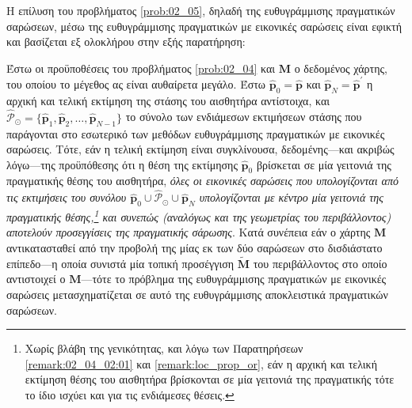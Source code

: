 Η επίλυση του προβλήματος \ref{prob:02_05}, δηλαδή της ευθυγράμμισης
πραγματικών σαρώσεων, μέσω της ευθυγράμμισης πραγματικών με εικονικές σαρώσεις
είναι εφικτή και βασίζεται εξ ολοκλήρου στην εξής παρατήρηση:

\begin{gg_box}
\begin{remark}
Έστω οι προϋποθέσεις του προβλήματος \ref{prob:02_04} και $\bm{M}$ ο δεδομένος
χάρτης, του οποίου το μέγεθος ας είναι αυθαίρετα μεγάλο. Έστω $\hat{\bm{p}}_0 =
\hat{\bm{p}}$ και $\hat{\bm{p}}_N = \hat{\bm{p}}^\prime$ η αρχική και τελική
εκτίμηση της στάσης του αισθητήρα αντίστοιχα, και $\hat{\mathcal{P}}_\odot =
\{\hat{\bm{p}}_1, \hat{\bm{p}}_2,\dots, \hat{\bm{p}}_{N-1}\}$ το σύνολο των
ενδιάμεσων εκτιμήσεων στάσης που παράγονται στο εσωτερικό των μεθόδων
ευθυγράμμισης πραγματικών με εικονικές σαρώσεις. Τότε, εάν η τελική εκτίμηση
είναι συγκλίνουσα, δεδομένης---και ακριβώς λόγω---της προϋπόθεσης ότι η θέση
της εκτίμησης $\hat{\bm{p}}_0$ βρίσκεται σε μία γειτονιά της πραγματικής θέσης
του αισθητήρα, \textit{όλες οι εικονικές σαρώσεις που υπολογίζονται από τις
εκτιμήσεις του συνόλου $\hat{\bm{p}}_0 \cup \hat{\mathcal{P}}_\odot \cup
\hat{\bm{p}}_N$ υπολογίζονται με κέντρο μία γειτονιά της πραγματικής
θέσης,\footnote{Χωρίς βλάβη της γενικότητας, και λόγω των Παρατηρήσεων
\ref{remark:02_04_02:01} και \ref{remark:loc_prop_or}, εάν η αρχική και τελική
εκτίμηση θέσης του αισθητήρα βρίσκονται σε μία γειτονιά της πραγματικής τότε
το ίδιο ισχύει και για τις ενδιάμεσες θέσεις.} και συνεπώς (αναλόγως και της
γεωμετρίας του περιβάλλοντος) αποτελούν προσεγγίσεις της πραγματικής σάρωσης}.
Κατά συνέπεια εάν ο χάρτης $\bm{M}$ αντικατασταθεί από την προβολή της
μίας εκ των δύο σαρώσεων στο δισδιάστατο επίπεδο---η οποία συνιστά μία τοπική
προσέγγιση $\widetilde{\bm{M}}$ του περιβάλλοντος στο οποίο αντιστοιχεί ο
$\bm{M}$---τότε το πρόβλημα της ευθυγράμμισης πραγματικών με εικονικές σαρώσεις
μετασχηματίζεται σε αυτό της ευθυγράμμισης αποκλειστικά πραγματικών σαρώσεων.
\end{remark}
\end{gg_box}

